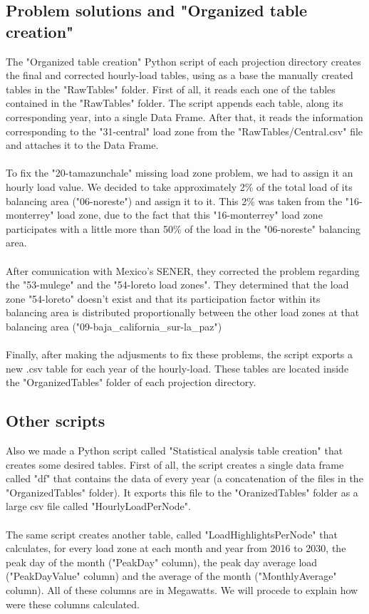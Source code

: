 \documentclass{article}
\begin{document}
\subsection{Problem solutions and "Organized table creation"}
The "Organized table creation" Python script of each projection directory creates the final and corrected hourly-load tables, using as a base the manually created tables in the "RawTables" folder. First of all, it reads each one of the tables contained in the "RawTables" folder. The script appends each table, along its corresponding year, into a single Data Frame. After that, it reads the information corresponding to the "31-central" load zone from the "RawTables/Central.csv" file and attaches it to the Data Frame.
\\
\\ To fix the "20-tamazunchale" missing load zone problem, we had to assign it an hourly load value. We decided to take approximately 2\% of the total load of its balancing area ("06-noreste") and assign it to it. This 2\% was taken from the "16-monterrey" load zone, due to the fact that this "16-monterrey" load zone participates with a little more than 50\% of the load in the "06-noreste" balancing area. 
\\
\\After comunication with Mexico's SENER, they corrected the problem regarding the "53-mulege" and the "54-loreto load zones". They determined that the load zone "54-loreto" doesn't exist and that its participation factor within its balancing area is distributed proportionally between the other load zones at that balancing area ("09-baja\_california\_sur-la\_paz")
\\
\\Finally, after making the adjusments to fix these problems, the script exports a new .csv table for each year of the hourly-load. These tables are located inside the "OrganizedTables" folder of each projection directory.
\subsection{Other scripts}
Also we made a Python script called "Statistical analysis table creation" that creates some desired tables. First of all, the script creates a single data frame called "df" that contains the data of every year (a concatenation of the files in the "OrganizedTables" folder). It exports this file to the "OranizedTables" folder as a large csv file called "HourlyLoadPerNode". 
\\
\\The same script creates another table, called "LoadHighlightsPerNode" that calculates, for every load zone at each month and year from 2016 to 2030, the peak day of the month ("PeakDay" column), the peak day average load ("PeakDayValue" column) and the average of the month ("MonthlyAverage" column). All of these columns are in Megawatts. We will procede to explain how were these columns calculated.
\end{document}
